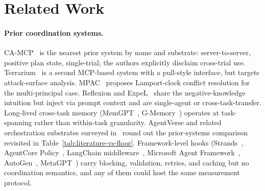 \section{Related Work}
\label{sec:related}

\paragraph{Prior coordination systems.}
CA-MCP~\cite{camcp2026} is the nearest prior system by name and
substrate: server-to-server, positive plan state, single-trial;
the authors explicitly disclaim cross-trial use.
Terrarium~\cite{terrarium2025} is a second MCP-based system
with a pull-style interface, but targets attack-surface analysis.
MPAC~\cite{mpac2026} proposes Lamport-clock conflict resolution
for the multi-principal case. Reflexion and
ExpeL~\cite{reflexion2023,expel2024} share the negative-knowledge
intuition but inject via prompt context and are single-agent or
cross-task-transfer. Long-lived cross-task memory
(MemGPT~\cite{memgpt2024}, G-Memory~\cite{gmemory2025}) operates
at task-spanning rather than within-task granularity.
AgentVerse and related orchestration substrates surveyed
in~\cite{mast2025} round out the prior-systems comparison
revisited in Table~\ref{tab:literature-vs-floor}. Framework-level hooks
(Strands~\cite{strandshooks2025}, AgentCore
Policy~\cite{agentcorepolicy2025},
LangChain middleware~\cite{langchainmiddleware2026},
Microsoft Agent Framework~\cite{msagentframework2026},
AutoGen~\cite{autogen2023}, MetaGPT~\cite{metagpt2024})
carry blocking, validation, retries, and caching but no
coordination semantics, and any of them could host the same
measurement protocol.

